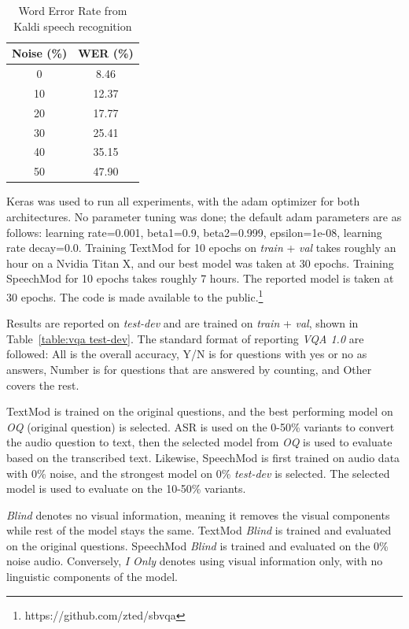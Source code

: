\documentclass[letterpaper]{article} %
\begin{document}
\begin{table}[t]
\centering
\caption{Word Error Rate from Kaldi speech recognition}
\label{table:wer}
\begin{tabular}{c|c}
Noise (\%)   & WER (\%) \\ \hline
0  & 8.46  \\
10 & 12.37 \\
20 & 17.77 \\
30 & 25.41 \\
40 & 35.15 \\
50 & 47.90
\end{tabular}
\end{table}


Keras was used to run all experiments, with the adam optimizer for both architectures. No parameter tuning was done; the default adam parameters are as follows: learning rate=0.001, beta1=0.9, beta2=0.999, epsilon=1e-08, learning  rate decay=0.0. Training TextMod for 10 epochs on \textit{train} + \textit{val} takes roughly an hour on a Nvidia Titan X, and our best model was taken at 30 epochs. Training SpeechMod for 10 epochs takes roughly 7 hours. The reported model is taken at 30 epochs. The code is made available to the public.\footnote{https://github.com/zted/sbvqa}

Results are reported on \textit{test-dev} and are trained on \textit{train} + \textit{val}, shown in Table~\ref{table:vqa test-dev}. The standard format of reporting \textit{VQA 1.0} are followed: All is the overall accuracy, Y/N is for questions with yes or no as answers, Number is for questions that are answered by counting, and Other covers the rest.

TextMod is trained on the original questions, and the best performing model on \textit{OQ} (original question) is selected. ASR is used on the 0-50\% variants to convert the audio question to text, then the selected model from \textit{OQ} is used to evaluate based on the transcribed text. Likewise, SpeechMod is first trained on audio data with 0\% noise, and the strongest model on 0\% \textit{test-dev} is selected. The selected model is used to evaluate on the 10-50\% variants.

\textit{Blind} denotes no visual information, meaning it removes the visual components while rest of the model stays the same. TextMod \textit{Blind} is trained and evaluated on the original questions. SpeechMod \textit{Blind} is trained and evaluated on the 0\% noise audio. Conversely, \textit{I Only} denotes using visual information only, with no linguistic components of the model.
\end{document}
